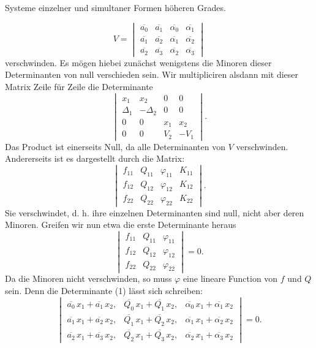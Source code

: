 \documentclass[11pt]{article}
\providecommand{\weberpage}[1]{}
\providecommand{\weq}[2]{\begin{equation}\tag{#1}#2\end{equation}}
\let\Delta\varDelta
\begin{document}
\weberpage{353}
Systeme einzelner und simultaner Formen höheren Grades.

\[
V = \begin{vmatrix}
\overline{a_0} & \overline{a_1} & \overline{\alpha_0} & \overline{\alpha_1} \\
\overline{a_1} & \overline{a_2} & \overline{\alpha_1} & \overline{\alpha_2} \\
\overline{a_2} & \overline{a_3} & \overline{\alpha_2} & \overline{\alpha_3}
\end{vmatrix}
\]
verschwinden. Es mögen hiebei zunächst wenigstens die Minoren dieser Determinanten von null verschieden sein. Wir multipliciren alsdann mit dieser Matrix Zeile für Zeile die Determinante
\[
\begin{vmatrix}
x_1 & x_2 & 0 & 0 \\
\Delta_1 & -\Delta_2 & 0 & 0 \\
0 & 0 & x_1 & x_2 \\
0 & 0 & V_2 & -V_1
\end{vmatrix}.
\]
Das Product ist einerseits Null, da alle Determinanten von $V$ verschwinden. Andererseits ist es dargestellt durch die Matrix:
\[
\begin{vmatrix}
f_{11} & Q_{11} & \varphi_{11} & K_{11} \\
f_{12} & Q_{12} & \varphi_{12} & K_{12} \\
f_{22} & Q_{22} & \varphi_{22} & K_{22}
\end{vmatrix}.
\]
Sie verschwindet, d. h. ihre einzelnen Determinanten sind null, nicht aber deren Minoren. Greifen wir nun etwa die erste Determinante heraus
\weq{1}{
\begin{vmatrix}
f_{11} & Q_{11} & \varphi_{11} \\
f_{12} & Q_{12} & \varphi_{12} \\
f_{22} & Q_{22} & \varphi_{22}
\end{vmatrix} = 0.
}
Da die Minoren nicht verschwinden, so muss $\varphi$ eine lineare Function von $f$ und $Q$ sein. Denn die Determinante (1) lässt sich schreiben:
\[
\begin{vmatrix}
\overline{a_0}\,x_1 + \overline{a_1}\,x_2, & \overline{Q_0}\,x_1 + \overline{Q_1}\,x_2, & \overline{\alpha_0}\,x_1 + \overline{\alpha_1}\,x_2 \\
\overline{a_1}\,x_1 + \overline{a_2}\,x_2, & \overline{Q_1}\,x_1 + \overline{Q_2}\,x_2, & \overline{\alpha_1}\,x_1 + \overline{\alpha_2}\,x_2 \\
\overline{a_2}\,x_1 + \overline{a_3}\,x_2, & \overline{Q_2}\,x_1 + \overline{Q_3}\,x_2, & \overline{\alpha_2}\,x_1 + \overline{\alpha_3}\,x_2
\end{vmatrix} = 0.
\]
\end{document}
